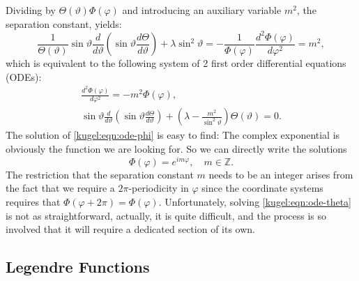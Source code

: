 Dividing by $\Theta(\vartheta)\Phi(\varphi)$ and introducing an auxiliary
variable $m^2$, the separation constant, yields:
\begin{equation*}
  \frac{1}{\Theta(\vartheta)}\sin \vartheta \frac{d}{d \vartheta} \left(
    \sin \vartheta \frac{d \Theta}{d \vartheta}
  \right)
  + \lambda \sin^2 \vartheta
  = -\frac{1}{\Phi(\varphi)} \frac{d^2\Phi(\varphi)}{d\varphi^2}
  = m^2,
\end{equation*}
which is equivalent to the following system of 2 first order differential
equations (ODEs):
\begin{subequations}
  \begin{gather}
    \frac{d^2\Phi(\varphi)}{d\varphi^2} = -m^2 \Phi(\varphi),
      \label{kugel:eqn:ode-phi} \\ 
    \sin \vartheta \frac{d}{d \vartheta} \left(
      \sin \vartheta \frac{d \Theta}{d \vartheta}
    \right)
    + \left( \lambda - \frac{m^2}{\sin^2 \vartheta} \right)
      \Theta(\vartheta) = 0
      \label{kugel:eqn:ode-theta}.
  \end{gather}
\end{subequations}
The solution of \eqref{kugel:eqn:ode-phi} is easy to find: The complex
exponential is obviously the function we are looking for. So we can directly
write the solutions
\begin{equation} \label{kugel:eqn:ode-phi-sol}
    \Phi(\varphi) = e^{i m \varphi}, \quad m \in \mathbb{Z}.
\end{equation}
The restriction that the separation constant $m$ needs to be an integer arises
from the fact that we require a $2\pi$-periodicity in $\varphi$ since the
coordinate systems requires that $\Phi(\varphi + 2\pi) = \Phi(\varphi)$.
Unfortunately, solving \eqref{kugel:eqn:ode-theta} is not as straightforward,
actually, it is quite difficult, and the process is so involved that it will
require a dedicated section of its own.

\subsection{Legendre Functions}

\begin{figure}
  \centering
  \caption{
  }
\end{figure}

